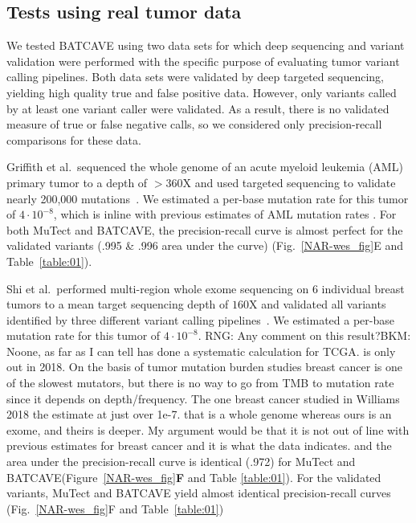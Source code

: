 \documentclass[a4,center,fleqn]{NAR}
\newcommand{\rngcomment}[1]{{\color{red}RNG: #1}}
\newcommand{\bkmcomment}[1]{{\color{blue}BKM: #1}}
\newcommand{\batcave}{BATCAVE\xspace}
\begin{document}
\subsection{Tests using real tumor data}
We tested \batcave using two data sets for which deep sequencing and variant validation were performed with the specific purpose of evaluating tumor variant calling pipelines.
Both data sets were validated by deep targeted sequencing, yielding high quality true and false positive data.
However, only variants called by at least one variant caller were validated.
As a result, there is no validated measure of true or false negative calls, so we considered only precision-recall comparisons for these data.

Griffith et al.\ sequenced the whole genome of an acute myeloid leukemia (AML) primary tumor to a depth of $>$360X and used targeted sequencing to validate nearly 200,000 mutations~\cite{Griffith2015}.
We estimated a per-base mutation rate for this tumor of $4\cdot10^{-8}$, which is inline with previous estimates of AML mutation rates \cite{Griffith2015,Williams2018}.
For both MuTect and \batcave, the precision-recall curve is almost perfect for the validated variants (.995 \& .996 area under the curve) (Fig.~\ref{NAR-wes_fig}E and Table~\ref{table:01}).

Shi et al.\ performed multi-region whole exome sequencing on 6 individual breast tumors to a mean target sequencing depth of $160\mathrm{X}$ and validated all variants identified by three different variant calling pipelines~\cite{Shi2018}.
We estimated a per-base mutation rate for this tumor of $4\cdot10^{-8}$. \rngcomment{Any comment on this result?}\bkmcomment{Noone, as far as I can tell has done a systematic calculation for TCGA. \cite{Williams2018} is only out in 2018. On the basis of tumor mutation burden studies breast cancer is one of the slowest mutators, but there is no way to go from TMB to mutation rate since it depends on depth/frequency. The one breast cancer studied in Williams 2018 the estimate at just over 1e-7. that is a whole genome whereas ours is an exome, and theirs is deeper. My argument would be that it is not out of line with previous estimates for breast cancer and it is what the data indicates.}
and the area under the precision-recall curve is identical (.972) for MuTect and \batcave (Figure~\ref{NAR-wes_fig}\textbf{F} and Table \ref{table:01}).
For the validated variants, MuTect and \batcave yield almost identical precision-recall curves (Fig.~\ref{NAR-wes_fig}F and Table~\ref{table:01})
\end{document}
